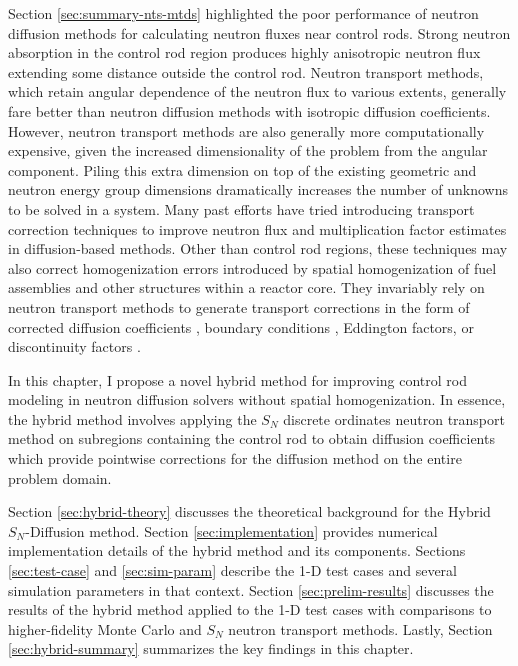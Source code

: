 Section \ref{sec:summary-nts-mtds} highlighted the poor performance of neutron diffusion
methods for calculating neutron fluxes near control rods. Strong neutron absorption in the control
rod region produces highly anisotropic neutron flux extending some distance outside the control
rod. Neutron transport methods, which retain angular dependence of the neutron flux to various
extents, generally fare better than neutron diffusion methods with isotropic diffusion
coefficients. However, neutron transport methods are also generally more computationally expensive,
given the increased dimensionality of the problem from the angular component. Piling this extra
dimension on top of the existing geometric and neutron energy group dimensions dramatically
increases the number of unknowns to be solved in a system. Many past efforts have tried introducing
transport correction techniques to improve neutron flux and multiplication factor estimates in
diffusion-based methods. Other than control rod regions, these techniques may also correct
homogenization errors introduced by spatial homogenization of fuel assemblies and other
structures within a reactor core. They invariably rely on neutron transport methods to generate
transport corrections in the form of corrected diffusion coefficients
\cite{bretscher_computing_1997, scherer_determination_1976, ronen_accurate_2004,
pounders_diffusion_2009, kavenoky_sph_1978}, boundary conditions \cite{davison_influence_1951,
pellaud_extrapolation_1968, fen_modelling_1992}, Eddington factors, or discontinuity factors
\cite{koebke_new_1980}.

In this chapter, I propose a novel hybrid method for improving control rod modeling in neutron
diffusion solvers without spatial homogenization. In essence, the hybrid method involves applying
the $S_N$ discrete ordinates neutron transport method on subregions containing the control rod to
obtain diffusion coefficients which provide pointwise corrections for the diffusion method on the
entire problem domain.

Section \ref{sec:hybrid-theory} discusses the theoretical background for the Hybrid $S_N$-Diffusion
method. Section \ref{sec:implementation} provides numerical implementation details of
the hybrid method and its components. Sections \ref{sec:test-case} and \ref{sec:sim-param} describe
the 1-D test cases and several simulation parameters in that context. Section
\ref{sec:prelim-results} discusses the results of the hybrid method applied to the 1-D test cases
with comparisons to higher-fidelity Monte Carlo and $S_N$ neutron transport methods. Lastly,
Section \ref{sec:hybrid-summary} summarizes the key findings in this chapter.

